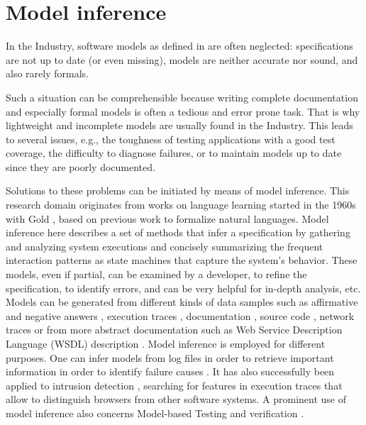 \section{Model inference}
\label{sec:related:modelinf}

In the Industry, software models as defined in
 are
often neglected: specifications are not up to date (or even
missing), models are neither accurate nor sound, and also rarely
formals.

Such a situation can be comprehensible because writing complete
documentation and especially formal models is often a tedious and
error prone task. That is why lightweight and incomplete models
are usually found in the Industry. This leads to several issues,
e.g., the toughness of testing applications with a good test
coverage, the difficulty to diagnose failures, or to maintain
models up to date since they are poorly documented.

Solutions to these problems can be initiated by means of model
inference. This research domain originates from works on language
learning started in the 1960s with Gold \cite{Gold1978302}, based
on previous work to formalize natural languages. Model inference
here describes a set of methods that infer a specification by
gathering and analyzing system executions and concisely
summarizing the frequent interaction patterns as state machines
that capture the system's behavior. These models, even if
partial, can be examined by a developer, to refine the
specification, to identify errors, and can be very helpful for
in-depth analysis, etc. Models can be generated from different
kinds of data samples such as affirmative and negative answers
\cite{Angluin198787}, execution traces
\cite{Krka:2010:UDE:1810295.1810324}, documentation
\cite{ZhongZXM11}, source code
\cite{Salah05scenariographer,Pradel:2009}, network traces
\cite{6079839} or from more abstract documentation such as Web
Service Description Language (WSDL)
description \cite{Bertolino:2009:ASB:1595696.1595719}.  Model
inference is employed for different purposes. One can infer
models from log files in order to retrieve important information
in order to identify failure causes \cite{4700316}. It has also
successfully been applied to intrusion detection \cite{debar00},
searching for features in execution traces that allow to
distinguish browsers from other software systems. A prominent use
of model inference also concerns Model-based Testing
\cite{Lorenzoli2008,tap2011,MobiGUITARIEEESoftware2014} and
verification \cite{Ammons:2002:MS:565816.503275}.


